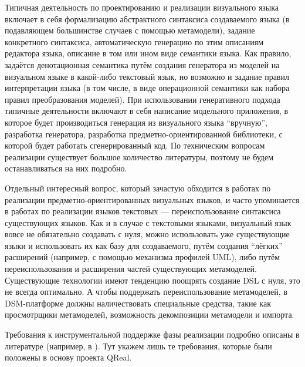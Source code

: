 Типичная деятельность по проектированию и реализации визуального языка включает в себя 
формализацию абстрактного синтаксиса создаваемого языка (в подавляющем большинстве случаев 
с помощью метамодели), задание конкретного синтаксиса, автоматическую генерацию по этим 
описаниям редактора языка, описание в том или ином виде семантики языка. Как правило, 
задаётся денотационная семантика путём создания генератора из моделей на визуальном языке 
в какой-либо текстовый язык, но возможно и задание правил интерпретации языка (в том числе, 
в виде операционной семантики как набора правил преобразования моделей). При использовании 
генеративного подхода типичные деятельности включают в себя написание модельного приложения, 
в которое будет производиться генерация из визуального языка "`вручную"', разработка генератора, 
разработка предметно-ориентированной библиотеки, с которой будет работать сгенерированный код. 
По техническим вопросам реализации существует большое количество литературы, поэтому 
не будем останавливаться на них подробно.

Отдельный интересный вопрос, который зачастую обходится в работах по реализации предметно-ориентированных 
визуальных языков, и часто упоминается в работах по реализации языков текстовых --- переиспользование 
синтаксиса существующих языков. Как и в случае с текстовыми языками, визуальный язык 
вовсе не обязательно создавать с нуля, можно использовать уже существующие языки и 
использовать их как базу для создаваемого, путём создания "`лёгких"' расширений (например, 
с помощью механизма профилей UML), либо путём переиспользования и расширения частей 
существующих метамоделей. Существующие технологии имеют тенденцию поощрять создание DSL с нуля, 
это не всегда оптимально. А чтобы поддержать переиспользование метамоделей, в DSM-платформе 
должны наличествовать специальные средства, такие как просмотрщики метамоделей, возможность 
декомпозиции метамодели и импорта.

Требования к инструментальной поддержке фазы реализации подробно описаны в литературе 
(например, в \cite{kelly2008domain}). Тут укажем лишь те требования, которые были 
положены в основу проекта QReal.

